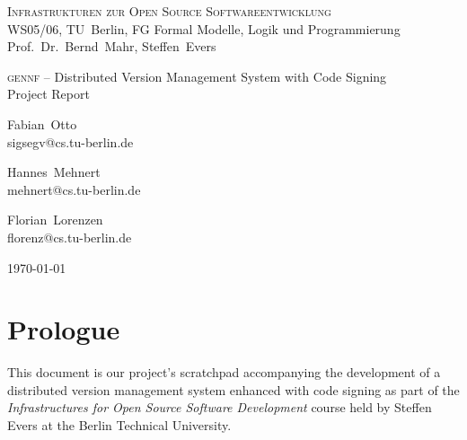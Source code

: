 \documentclass[fleqn, 10pt, a4paper]{report}
\newcommand{\GENNF}{\textsc{gennf}}
\begin{document}
\begin{center}
  {\scshape Infrastrukturen zur Open Source Softwareentwicklung} \\
  WS05/06, TU~Berlin, FG Formal Modelle, Logik und
  Programmierung \\
  Prof.~Dr.~Bernd~Mahr, Steffen~Evers
  \bigskip

  {\LARGE
    \GENNF{} -- Distributed Version Management System with Code Signing \\
    Project Report}
  \bigskip

  {\large
    \begin{minipage}[t]{0.25\linewidth}
      \begin{center}
        Fabian~Otto \\ \vspace{-2mm}
        {\scriptsize\ttfamily sigsegv@cs.tu-berlin.de}
      \end{center}
    \end{minipage}\hspace{8mm}
    \begin{minipage}[t]{0.25\linewidth}
      \begin{center}
        Hannes~Mehnert \\ \vspace{-2mm}
        {\scriptsize\ttfamily mehnert@cs.tu-berlin.de}
      \end{center}
    \end{minipage}\hspace{8mm}
    \begin{minipage}[t]{0.25\linewidth}
      \begin{center}
        Florian~Lorenzen \\ \vspace{-2mm}
        {\scriptsize\ttfamily florenz@cs.tu-berlin.de}
      \end{center}
    \end{minipage}
    \bigskip

    \today }

\end{center}
\bigskip

\tableofcontents


\section{Prologue}

This document is our project's scratchpad accompanying the development
of a distributed version management system enhanced with code signing as
part of the \emph{Infrastructures for Open Source Software Development}
course held by Steffen Evers at the Berlin Technical University.
\end{document}
